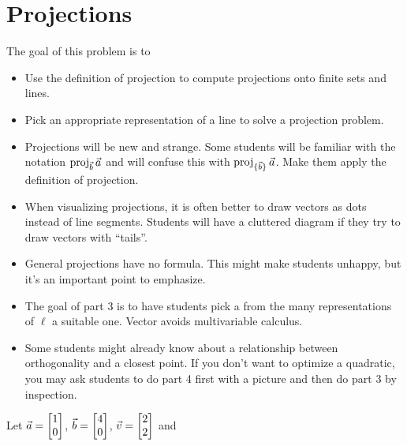 \section*{Projections}


	\question
	\begin{annotation}
		\begin{goals}

			The goal of this problem is to
			\begin{itemize}
				\item Use the definition of projection to compute projections onto finite sets and lines.
				\item Pick an appropriate representation of a line to solve a projection problem.
			\end{itemize}
		\end{goals}
		\begin{notes}
			\begin{itemize}
				\item Projections will be new and strange. Some students will be familiar with
					the notation $\operatorname{proj}_{\vec b}\vec a$ and will confuse this
					with $\operatorname{proj}_{\{\vec b\}}\vec a$. Make them apply the definition of projection.
				\item When visualizing projections, it is often better to draw vectors as dots instead
					of line segments. Students will have a cluttered diagram if they try to
					draw vectors with ``tails''.
				\item General projections have no formula. This might make students unhappy, but it's an
					important point to emphasize.
				\item The goal of part 3 is to have students pick a from the many representations of $\ell$
					a suitable one. Vector avoids multivariable calculus.

				\item Some students might already know about a relationship between orthogonality and
					a closest point. If you don't want to optimize a quadratic,
					you may ask students to do part 4 first with a picture and then do part 3 by inspection.
			\end{itemize}
		\end{notes}
	\end{annotation}
	Let $\vec a=\mat{1\\0}$, $\vec b=\mat{4\\0}$, $\vec v=\mat{2\\2}$ and
